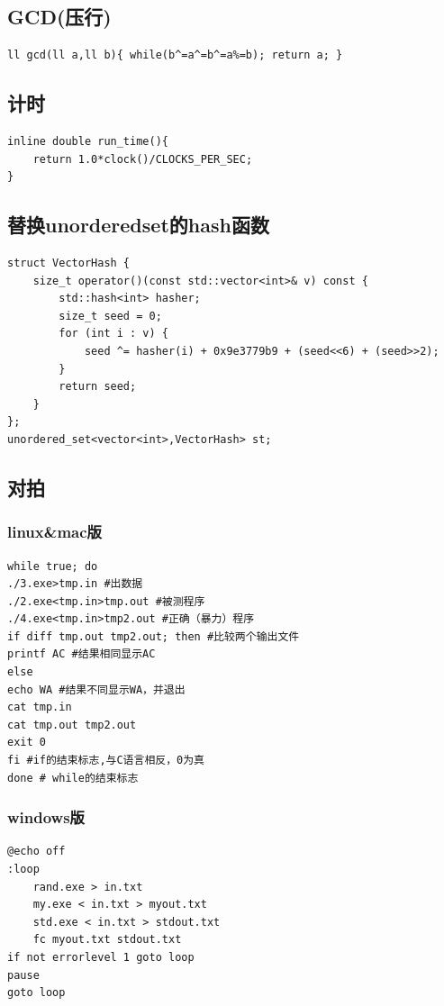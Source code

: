 \documentclass[a4]{ctexart}
\begin{document}
\subsection{GCD(压行)}
\begin{lstlisting}
ll gcd(ll a,ll b){ while(b^=a^=b^=a%=b); return a; }
\end{lstlisting}

\subsection{计时}
\begin{lstlisting}
inline double run_time(){
    return 1.0*clock()/CLOCKS_PER_SEC;
}
\end{lstlisting}


\subsection{替换unorderedset的hash函数}
\begin{lstlisting}
struct VectorHash {
    size_t operator()(const std::vector<int>& v) const {
        std::hash<int> hasher;
        size_t seed = 0;
        for (int i : v) {
            seed ^= hasher(i) + 0x9e3779b9 + (seed<<6) + (seed>>2);
        }
        return seed;
    }
};
unordered_set<vector<int>,VectorHash> st;
\end{lstlisting}
\subsection{对拍}
\subsubsection{linux\&mac版}
\begin{lstlisting}
while true; do
./3.exe>tmp.in #出数据
./2.exe<tmp.in>tmp.out #被测程序
./4.exe<tmp.in>tmp2.out #正确（暴力）程序
if diff tmp.out tmp2.out; then #比较两个输出文件
printf AC #结果相同显示AC
else
echo WA #结果不同显示WA，并退出
cat tmp.in
cat tmp.out tmp2.out
exit 0
fi #if的结束标志,与C语言相反，0为真
done # while的结束标志
\end{lstlisting}
\subsubsection{windows版}
\begin{lstlisting}
@echo off  
:loop  
    rand.exe > in.txt
    my.exe < in.txt > myout.txt
    std.exe < in.txt > stdout.txt
    fc myout.txt stdout.txt
if not errorlevel 1 goto loop  
pause
goto loop
\end{lstlisting}
\end{document}
